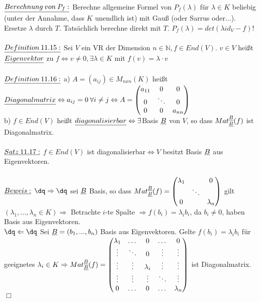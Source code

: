 \documentclass[fleqn, a4paper, 11pt]{article}
\begin{document}
\\
$\uline{Berechnung\:von\:P_f:}$ Berechne allgemeine Formel von $P_f(\lambda)$ f\"ur $\lambda\in K$ beliebig (unter der Annahme, dass $K$ unendlich ist) mit Gau\ss{} (oder Sarrus oder...). Ersetze $\lambda$ durch $T$. Tats\"achlich berechne direkt mit $T$. $P_f(\lambda)=det(\lambda id_V-f)!$\\
\\
$\uline{Definition\:11.15:}$ Sei $V$ ein VR der Dimension $n\in\mathbb{N},f\in End(V)$. $v\in V$ hei\ss{}t $\uline{Eigenvektor}$ zu $f\Leftrightarrow v\neq 0,\exists\lambda\in K$ mit $f(v)=\lambda\cdot v$\\
\\
$\uline{Definition\:11.16:}$ a) $A=(a_{ij})\in M_{nxn}(K)$ hei\ss{}t $\uline{Diagonalmatrix}\Leftrightarrow a_{ij}=0\:\forall i\neq j\Leftrightarrow A=\begin{pmatrix}
	a_{11} & 0 & 0\\
	0 & \ddots & 0\\
	0 & 0 & a_{nn}
\end{pmatrix}$\\
b) $f\in End(V)$ hei\ss{}t $\uline{diagonalisierbar}\Leftrightarrow\exists$Basis $\uline{B}$ von $V$, so dass $Mat_{\uline{B}}^{\uline{B}}(f)$ ist Diagonalmatrix.\\
\\
$\uline{Satz\:11.17:}$ $f\in End(V)$ ist diagonalisierbar$\Leftrightarrow V$ besitzt Basis $\uline{B}$ aus Eigenvektoren.\\
\\
$\uline{Beweis:}$ $\dq\Rightarrow\dq$ sei $\uline{B}$ Basis, so dass $Mat_{\uline{B}}^{\uline{B}}(f)=\begin{pmatrix}
	\lambda_1 & & 0\\
	& \ddots & \\
	0 & & \lambda_n
\end{pmatrix}$ gilt $(\lambda_1,...,\lambda_n\in K)\Rightarrow$ Betrachte $i$-te Spalte $\Rightarrow f(b_i)=\lambda_i b_i$, da $b_i\neq 0$, haben Basis aus Eigenvektoren.\\
$\dq\Leftarrow\dq$ Sei $\uline{B}=(b_1,...,b_n)$ Basis aus Eigenvektoren. Gelte $f(b_i)=\lambda_i b_i$ f\"ur geeignetes $\lambda_i\in K\Rightarrow Mat_{\uline{B}}^{\uline{B}}(f)=\begin{pmatrix}
	\lambda_1 & \dots & 0 & \dots & 0\\
	\vdots & \ddots & 0 & \vdots & \vdots \\
	\vdots & \vdots & \lambda_i & \vdots & \vdots \\
	\vdots & \vdots & \vdots & \ddots & \vdots \\
	0 & \dots & 0 & \dots & \lambda_n
\end{pmatrix}$ ist Diagonalmatrix. \hfill $\Box$\\
\end{document}

